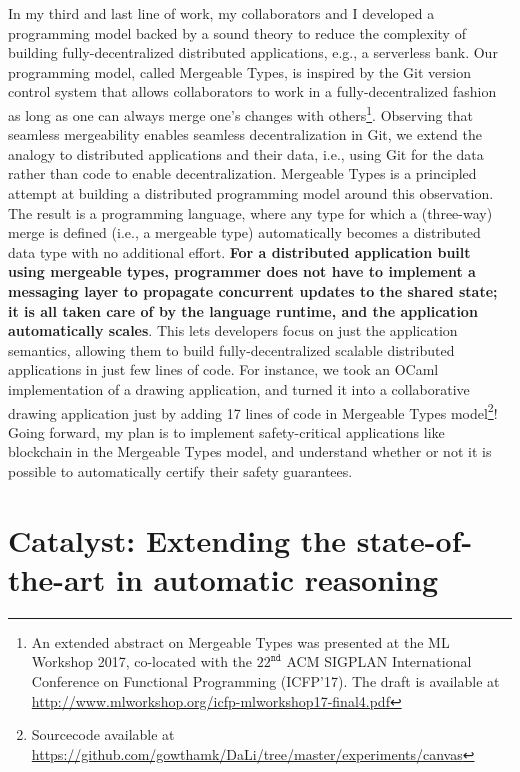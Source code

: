 In my third and last line of work, my collaborators and I developed a
programming model backed by a sound theory to reduce the complexity of
building fully-decentralized distributed applications, e.g., a
serverless bank. Our programming model, called Mergeable Types, is
inspired by the Git version control system that allows collaborators
to work in a fully-decentralized fashion as long as one can always
merge one's changes with others\footnote{An extended abstract on
Mergeable Types was presented at the ML Workshop 2017, co-located with
the $22^{\texttt{nd}}$ ACM SIGPLAN International Conference on
Functional Programming (ICFP'17). The draft is available
at \url{http://www.mlworkshop.org/icfp-mlworkshop17-final4.pdf}}.
Observing that seamless mergeability enables seamless decentralization
in Git, we extend the analogy to distributed applications and their
data, i.e., using Git for the data rather than code to enable
decentralization. Mergeable Types is a principled attempt at building
a distributed programming model around this observation. The result is
a programming language, where any type for which a (three-way) merge
is defined (i.e., a mergeable type) automatically becomes a
distributed data type with no additional effort. {\bf For a
distributed application built using mergeable types, programmer does
not have to implement a messaging layer to propagate concurrent
updates to the shared state; it is all taken care of by the language
runtime, and the application automatically scales}. This lets
developers focus on just the application semantics, allowing them to
build fully-decentralized scalable distributed applications in just
few lines of code. For instance, we took an OCaml implementation of a
drawing application, and turned it into a collaborative drawing
application just by adding 17 lines of code in Mergeable Types
model\footnote{Sourcecode available at
\url{https://github.com/gowthamk/DaLi/tree/master/experiments/canvas}}!
Going forward, my plan is to implement safety-critical applications
like blockchain in the Mergeable Types model, and understand whether
or not it is possible to
automatically certify their safety guarantees.

\section*{{\sc Catalyst}: Extending the state-of-the-art in automatic
reasoning}

